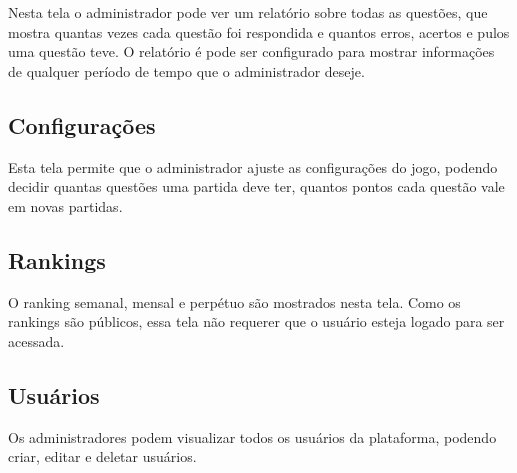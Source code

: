 Nesta tela o administrador pode ver um relatório sobre todas as questões, que mostra quantas vezes cada questão foi respondida e quantos erros, acertos e pulos uma questão teve. O relatório é pode ser configurado para mostrar informações de  qualquer período de tempo que o administrador deseje.

\subsection{Configurações}
\label{subsec:configreact}

Esta tela permite que o administrador ajuste as configurações do jogo, podendo decidir quantas questões uma partida deve ter, quantos pontos cada questão vale em novas partidas.

\subsection{Rankings}
\label{subsec:rankingsreact}

O ranking semanal, mensal e perpétuo são mostrados nesta tela. Como os rankings são públicos, essa tela não requerer que o usuário esteja logado para ser acessada.

\subsection{Usuários}
\label{subsec:usuariosreact}

Os administradores podem visualizar todos os usuários da plataforma, podendo criar, editar e deletar usuários.